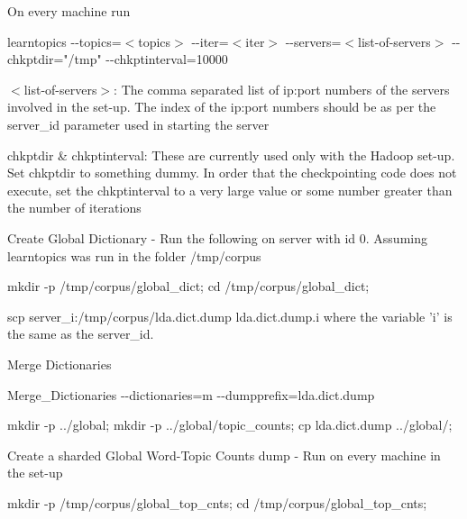 \begin{DoxyEnumerate}
\begin{DoxyEnumerate}
\begin{DoxyEnumerate}
On every machine run 

{\ttfamily learntopics -\/-\/topics=$<$topics$>$ -\/-\/iter=$<$iter$>$ -\/-\/servers=$<$list-\/of-\/servers$>$ -\/-\/chkptdir="/tmp" -\/-\/chkptinterval=10000} 
\begin{DoxyEnumerate}
\item 

$<$list-\/of-\/servers$>$: The comma separated list of ip:port numbers of the servers involved in the set-\/up. The index of the ip:port numbers should be as per the server\_\-id parameter used in starting the server 
\item 

chkptdir \& chkptinterval: These are currently used only with the Hadoop set-\/up. Set chkptdir to something dummy. In order that the checkpointing code does not execute, set the chkptinterval to a very large value or some number greater than the number of iterations 
\end{DoxyEnumerate}
\item 

Create Global Dictionary -\/ Run the following on server with id 0. Assuming learntopics was run in the folder /tmp/corpus 
\begin{DoxyEnumerate}
\item 

{\ttfamily mkdir -\/p /tmp/corpus/global\_\-dict; cd /tmp/corpus/global\_\-dict;} 
\item 

{\ttfamily scp server\_\-i:/tmp/corpus/lda.dict.dump lda.dict.dump.i } where the variable 'i' is the same as the server\_\-id. 
\item 

Merge Dictionaries\par
 {\ttfamily Merge\_\-Dictionaries -\/-\/dictionaries=m -\/-\/dumpprefix=lda.dict.dump} 
\item 

{\ttfamily mkdir -\/p ../global; mkdir -\/p ../global/topic\_\-counts; cp lda.dict.dump ../global/;}  
\end{DoxyEnumerate}
\item 

Create a sharded Global Word-\/Topic Counts dump -\/ Run on every machine in the set-\/up 
\begin{DoxyEnumerate}
\item 

{\ttfamily mkdir -\/p /tmp/corpus/global\_\-top\_\-cnts; cd /tmp/corpus/global\_\-top\_\-cnts;} 
\item 


\end{DoxyEnumerate}
\end{DoxyEnumerate}
\end{DoxyEnumerate}
\end{DoxyEnumerate}
